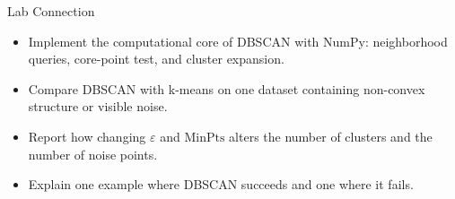 \begin{frame}{Lab Connection}
\begin{itemize}
  \item Implement the computational core of DBSCAN with NumPy: neighborhood queries, core-point test, and cluster expansion.
  \item Compare DBSCAN with k-means on one dataset containing non-convex structure or visible noise.
  \item Report how changing $\varepsilon$ and $\text{MinPts}$ alters the number of clusters and the number of noise points.
  \item Explain one example where DBSCAN succeeds and one where it fails.
\end{itemize}
\end{frame}
